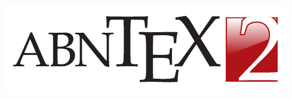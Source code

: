 \documentclass[
	10pt,				%
	openright,			%
	twoside,			%
	a5paper,			%
	english,			%
	french,				%
	spanish,			%
	brazil,				%
	sumario=tradicional
]{abntex2}
\begin{document}
\frenchspacing

\frontmatter

\begin{titlingpage}
\phantom{xxx}
\vspace{0.5cm}
\huge
\raggedright
\imprimirautor\\
\vspace{2.5cm}
\huge 
{\raggedleft
\includegraphics[scale=0.9]{abntex2-modelo-img-marca.pdf}\\[1cm]
\textit{\textcolor{blue}{\imprimirtitulo}}\\[1cm]
}
\centering 
\vfill
\Large
\imprimirinstituicao
\end{titlingpage}
\end{document}
